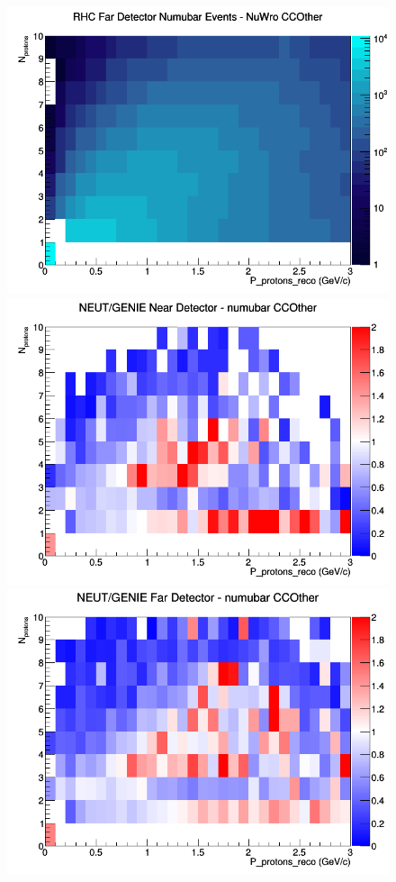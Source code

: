 \begin{figure}[h]
\endminipage
{}
\includegraphics[width=\linewidth]{eff_N_P/LAr/protons/CCOther_RHC_FD_numubar_N_P_NuWro.png}
\endminipage
\newline
{}
\includegraphics[width=\linewidth]{eff_N_P/LAr/protons/ratios/CCOther_NEUT_GENIE_numubar_near_N_P.png}
\endminipage
{}
\includegraphics[width=\linewidth]{eff_N_P/LAr/protons/ratios/CCOther_NEUT_GENIE_numubar_far_N_P.png}

\end{figure}
